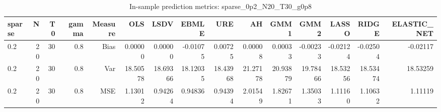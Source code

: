 \begin{table}[!htbp]\centering
\caption{In-sample prediction metrics: sparse_0p2_N20_T30_g0p8}
\label{tab:table2_sparse_0p2_N20_T30_g0p8}
\begin{tabular}{lrrrrrrrrrrrrrr}
\hline
sparse & N & T0 & gamma & Measure & OLS & LSDV & EBMLE & URE & AH & GMM1 & GMM2 & LASSO & RIDGE & ELASTIC_NET \\
\hline
0.2 & 20 & 30 & 0.8 & Bias & 0.00000 & 0.00000 & -0.01075 & 0.00725 & 0.00008 & 0.00033 & -0.00233 & -0.02124 & -0.02504 & -0.02117 \\
0.2 & 20 & 30 & 0.8 & Var & 18.50578 & 18.69366 & 18.12035 & 18.43968 & 21.27178 & 20.93879 & 19.78466 & 18.53256 & 18.53474 & 18.53259 \\
0.2 & 20 & 30 & 0.8 & MSE & 1.13012 & 0.94264 & 0.94836 & 0.94394 & 2.01549 & 1.82671 & 1.35033 & 1.11160 & 1.10632 & 1.11119 \\
\hline
\end{tabular}
\end{table}


